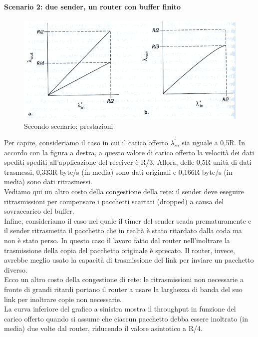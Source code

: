 \documentclass[11pt,a4paper]{book}
\begin{document}
\paragraph{Scenario 2: due sender, un router con buffer finito}
\begin{figure}
	\includegraphics[scale=0.6]{img/042.png}
	\caption{Secondo scenario: prestazioni}
\end{figure}
Per capire, consideriamo il caso in cui il carico offerto $\lambda_{in}^{'}$ sia uguale a 0,5R. In accordo con la figura a destra, a questo valore di carico offerto la velocità dei dati spediti spediti all'applicazione del receiver è R/3. Allora, delle 0,5R unità di dati trasmessi, 0,333R byte/s (in media) sono dati originali e 0,166R byte/s (in media) sono dati ritrasmessi. \\
Vediamo qui un altro costo della congestione della rete: il sender deve eseguire ritrasmissioni per compensare i pacchetti scartati (dropped) a causa del sovraccarico del buffer. \\
Infine, consideriamo il caso nel quale il timer del sender scada prematuramente e il sender ritrasmetta il pacchetto che in realtà è stato ritardato dalla coda ma non è stato perso. In questo caso il lavoro fatto dal router nell'inoltrare la trasmissione della copia del pacchetto originale è sprecato. Il router, invece, avrebbe meglio usato la capacità di trasmissione del link per inviare un pacchetto diverso. \\
Ecco un altro costo della congestione di rete: le ritrasmissioni non necessarie a fronte di grandi ritardi portano il router a usare la larghezza di banda del suo link per inoltrare copie non necessarie. \\
La curva inferiore del grafico a sinistra mostra il throughput in funzione  del carico offerto quando si assume che ciascun pacchetto debba essere inoltrato (in media) due volte dal router, riducendo il valore asintotico a R/4.
\end{document}
